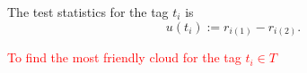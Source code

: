 \documentclass{llncs}
\begin{document}



The test statistics for the tag $t_i$ is
\[
u(t_i) := r_{i(1)} -  r_{i(2)}.
\]

\textcolor{red}{To find the most friendly cloud for the tag $t_i\in T$}













\end{document}
